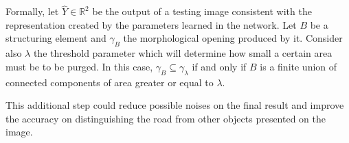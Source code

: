 Formally, let $\hat{Y}\in \mathbb{R}^2$ be the output of a testing image consistent with the representation created by the parameters learned in the network. Let $B$ be a structuring element and $\gamma_B$ the morphological opening produced by it. Consider also $\lambda$ the threshold parameter which will determine how small a certain area must be to be purged. In this case,  $\gamma_B \subseteq \gamma_\lambda$ if and only if $B$ is a finite union of connected components of area greater or equal to $\lambda$. 

This additional step could reduce possible noises on the final result and improve the accuracy on distinguishing the road from other objects presented on the image.


